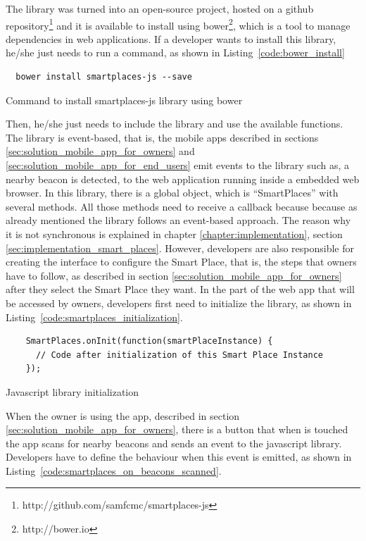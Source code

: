 The library was turned into an open-source project, hosted on a github repository\footnote{http://github.com/samfcmc/smartplaces-js} and it is available to install using bower\footnote{http://bower.io}, which is a tool to manage dependencies in web applications.
If a developer wants to install this library, he/she just needs to run a command, as shown in Listing~\ref{code:bower_install}

\begin{listing}[H]
  \begin{verbatim}
  bower install smartplaces-js --save
  \end{verbatim}
  \caption[Library installation using Bower]{Command to install smartplaces-js library using bower}
  \label{code:bower_install}
\end{listing}
Then, he/she just needs to include the library and use the available functions.
The library is event-based, that is, the mobile apps described in sections \ref{sec:solution_mobile_app_for_owners} and \ref{sec:solution_mobile_app_for_end_users} emit events to the library such as, a nearby beacon is detected, to the web application running inside a embedded web browser.
In this library, there is a global object, which is ``SmartPlaces'' with several methods.
All those methods need to receive a callback because because as already mentioned the library follows an event-based approach.
The reason why it is not synchronous is explained in chapter \ref{chapter:implementation}, section \ref{sec:implementation_smart_places}.
However, developers are also responsible for creating the interface to configure the Smart Place, that is, the steps that owners have to follow, as described in section \ref{sec:solution_mobile_app_for_owners} after they select the Smart Place they want.
In the part of the web app that will be accessed by owners, developers first need to initialize the library, as shown in Listing~\ref{code:smartplaces_initialization}.
\begin{listing}[H]
  \begin{verbatim}
    SmartPlaces.onInit(function(smartPlaceInstance) {
      // Code after initialization of this Smart Place Instance
    });
  \end{verbatim}
  \caption[Javascript library initialization]{Javascript library initialization}
  \label{code:smartplaces_initialization}
\end{listing}

When the owner is using the app, described in section \ref{sec:solution_mobile_app_for_owners}, there is a button that when is touched the app scans for nearby beacons and sends an event to the javascript library.
Developers have to define the behaviour when this event is emitted, as shown in
Listing~\ref{code:smartplaces_on_beacons_scanned}.

